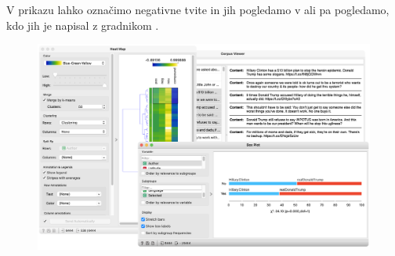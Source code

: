 V prikazu lahko označimo negativne tvite in jih pogledamo v  ali pa pogledamo, kdo jih je napisal z gradnikom .

\begin{figure}[h]
    \includegraphics[width=\linewidth]{sentiment-2.png}%
    \caption{}
    \label{fig:011-sentiment2}
\end{figure}